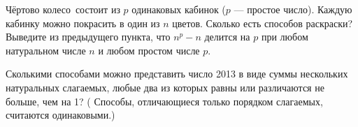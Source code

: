 \documentclass[a4paper,12pt]{article}
\begin{document}
  Ч\"ертово колесо \ состоит из $p$ одинаковых кабинок
($p$ --- простое число). Каждую кабинку можно покрасить в один
из $n$ цветов. Сколько есть способов раскраски?\\
Выведите из предыдущего пункта, что $n^p-n$ делится на $p$ при любом
натуральном числе $n$ и любом простом числе $p$.

Сколькими способами можно представить число 2013 в виде суммы
нескольких натуральных слагаемых, любые два из которых равны или
различаются не больше, чем на 1?
(%
Способы, отличающиеся только
порядком слагаемых, считаются одинаковыми.)


\end{document}
